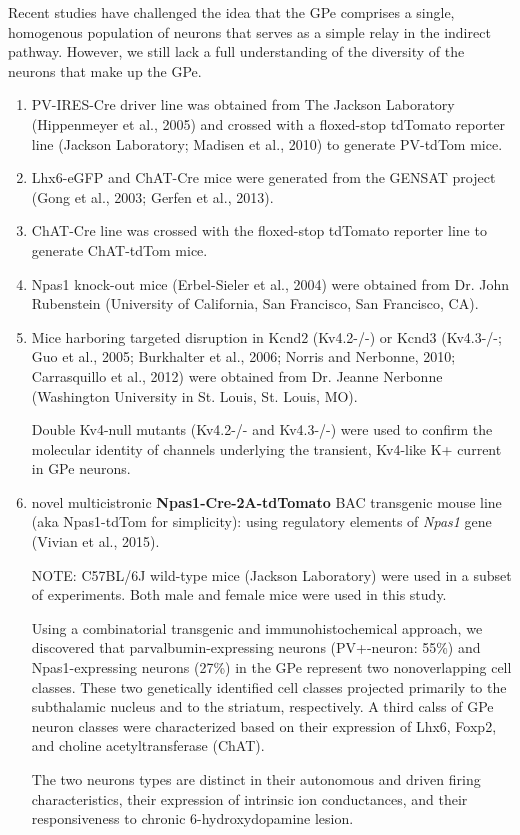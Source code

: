 Recent studies have challenged the idea that the GPe comprises a single,
homogenous population of neurons that serves as a simple relay in the indirect
pathway. However, we still lack a full understanding of the diversity of the
neurons that make up the GPe.
\begin{enumerate}
  
  \item PV-IRES-Cre driver line was obtained from The Jackson Laboratory
  (Hippenmeyer et al., 2005) and crossed with a floxed-stop tdTomato reporter
  line (Jackson Laboratory; Madisen et al., 2010) to generate PV-tdTom mice.
  
  \item  Lhx6-eGFP and ChAT-Cre mice were generated from the GENSAT project
  (Gong et al., 2003; Gerfen et al., 2013).
  
  \item  ChAT-Cre line was crossed with the floxed-stop tdTomato reporter line
  to generate ChAT-tdTom mice. 
  
  \item Npas1 knock-out mice (Erbel-Sieler et al., 2004) were obtained from Dr.
  John Rubenstein (University of California, San Francisco, San Francisco, CA).
  
  \item Mice harboring targeted disruption in Kcnd2 (Kv4.2-/-) or Kcnd3
  (Kv4.3-/-; Guo et al., 2005; Burkhalter et al., 2006; Norris and Nerbonne,
  2010; Carrasquillo et al., 2012) were obtained from Dr. Jeanne Nerbonne
  (Washington University in St. Louis, St. Louis, MO).
  
Double Kv4-null mutants (Kv4.2-/- and Kv4.3-/-) were used to confirm the
molecular identity of channels underlying the transient, Kv4-like K+ current in
GPe neurons.

  \item novel multicistronic {\bf Npas1-Cre-2A-tdTomato} BAC transgenic mouse
  line (aka Npas1-tdTom for simplicity):  using regulatory elements of {\it
  Npas1} gene (Vivian et al., 2015).

NOTE: C57BL/6J wild-type mice (Jackson Laboratory) were used in a subset of
  experiments. Both male and female mice were used in this study.
  
Using a combinatorial transgenic and immunohistochemical approach, we discovered
that parvalbumin-expressing neurons (PV+-neuron: 55\%) and Npas1-expressing
neurons (27\%) in the GPe represent two nonoverlapping cell classes.
These two genetically identified cell classes projected primarily to the
subthalamic nucleus and to the striatum, respectively.
A third calss of GPe neuron classes were characterized based on their expression
of Lhx6, Foxp2, and choline acetyltransferase (ChAT).

The two neurons types are distinct in their autonomous and driven firing
characteristics, their expression of intrinsic ion conductances, and their
responsiveness to chronic 6-hydroxydopamine lesion.
 
\end{enumerate}


